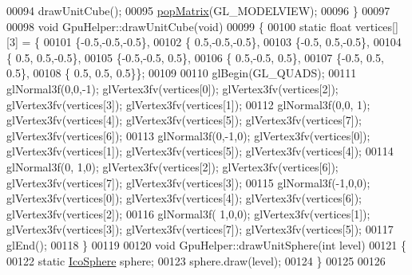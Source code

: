 \begin{DoxyCode}
00094     drawUnitCube();
00095     \hyperlink{class_gpu_helper_aad0cc23c2eaf0dcc610b180e5c8b195e}{popMatrix}(GL\_MODELVIEW);
00096 \}
00097 
00098 \textcolor{keywordtype}{void} GpuHelper::drawUnitCube(\textcolor{keywordtype}{void})
00099 \{
00100     \textcolor{keyword}{static} \textcolor{keywordtype}{float} vertices[][3] = \{
00101         \{-0.5,-0.5,-0.5\},
00102         \{ 0.5,-0.5,-0.5\},
00103         \{-0.5, 0.5,-0.5\},
00104         \{ 0.5, 0.5,-0.5\},
00105         \{-0.5,-0.5, 0.5\},
00106         \{ 0.5,-0.5, 0.5\},
00107         \{-0.5, 0.5, 0.5\},
00108         \{ 0.5, 0.5, 0.5\}\};
00109 
00110     glBegin(GL\_QUADS);
00111     glNormal3f(0,0,-1); glVertex3fv(vertices[0]); glVertex3fv(vertices[2]); glVertex3fv(vertices[3]); 
      glVertex3fv(vertices[1]);
00112     glNormal3f(0,0, 1); glVertex3fv(vertices[4]); glVertex3fv(vertices[5]); glVertex3fv(vertices[7]); 
      glVertex3fv(vertices[6]);
00113     glNormal3f(0,-1,0); glVertex3fv(vertices[0]); glVertex3fv(vertices[1]); glVertex3fv(vertices[5]); 
      glVertex3fv(vertices[4]);
00114     glNormal3f(0, 1,0); glVertex3fv(vertices[2]); glVertex3fv(vertices[6]); glVertex3fv(vertices[7]); 
      glVertex3fv(vertices[3]);
00115     glNormal3f(-1,0,0); glVertex3fv(vertices[0]); glVertex3fv(vertices[4]); glVertex3fv(vertices[6]); 
      glVertex3fv(vertices[2]);
00116     glNormal3f( 1,0,0); glVertex3fv(vertices[1]); glVertex3fv(vertices[3]); glVertex3fv(vertices[7]); 
      glVertex3fv(vertices[5]);
00117     glEnd();
00118 \}
00119 
00120 \textcolor{keywordtype}{void} GpuHelper::drawUnitSphere(\textcolor{keywordtype}{int} level)
00121 \{
00122   \textcolor{keyword}{static} \hyperlink{class_ico_sphere}{IcoSphere} sphere;
00123   sphere.draw(level);
00124 \}
00125 
00126 
\end{DoxyCode}

